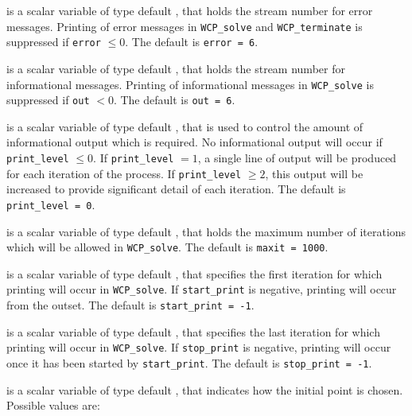 \documentclass{galahad}
\newcommand{\packagename}{WCP}
\begin{document}
\begin{description}

 is a scalar variable of type default \integer, that holds the
stream number for error messages. Printing of error messages in 
{\tt \packagename\_solve} and {\tt \packagename\_terminate} is suppressed if 
{\tt error} $\leq 0$.
The default is {\tt error = 6}.

 is a scalar variable of type default \integer, that holds the
stream number for informational messages. Printing of informational messages in 
{\tt \packagename\_solve} is suppressed if {\tt out} $< 0$.
The default is {\tt out = 6}.

 is a scalar variable of type default \integer, that is used
to control the amount of informational output which is required. No 
informational output will occur if {\tt print\_level} $\leq 0$. If 
{\tt print\_level} $= 1$, a single line of output will be produced for each
iteration of the process. If {\tt print\_level} $\geq 2$, this output will be
increased to provide significant detail of each iteration.
The default is {\tt print\_level = 0}.

 is a scalar variable of type default \integer, that holds the
maximum number of iterations which will be allowed in {\tt \packagename\_solve}.
The default is {\tt maxit = 1000}.

 is a scalar variable of type default \integer, that specifies
the first iteration for which printing will occur in {\tt \packagename\_solve}.
If {\tt start\_print} is negative, printing will occur from the outset.
The default is {\tt start\_print = -1}.

 is a scalar variable of type default \integer, that specifies
the last iteration for which printing will occur in  {\tt \packagename\_solve}.
If {\tt stop\_print} is negative, printing will occur once it has been 
started by {\tt start\_print}.
The default is {\tt stop\_print = -1}.

 is a scalar variable of type default \integer, 
that indicates how the initial point is chosen.
Possible values are:


\end{description}
\end{document}
